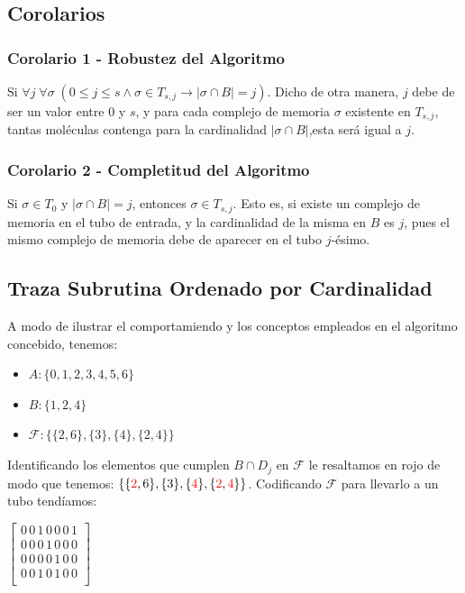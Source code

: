 \documentclass[12pt, letterpaper, twoside]{article}
\begin{document}
    \subsection{Corolarios}

    \subsubsection{Corolario 1 - Robustez del Algoritmo}
    Si $\forall{j}\;\forall\sigma\;(0\leq j \leq s \land \sigma\in T_{s,j} \rightarrow |\sigma\cap B| = j)$. Dicho de otra manera, $j$ debe de ser un valor entre $0$ y $s$, y para cada complejo de memoria $\sigma$ existente en $T_{s,j}$, tantas moléculas contenga para la cardinalidad $|\sigma\cap B|$,esta será igual a $j$. 
    \subsubsection{Corolario 2 - Completitud del Algoritmo}
    Si $\sigma\in T_0$ y $|\sigma\cap B| = j$, entonces $\sigma\in T_{s,j}$. Esto es, si existe un complejo de memoria en el tubo de entrada, y la cardinalidad de la misma en $B$ es $j$, pues el mismo complejo de memoria debe de aparecer en el tubo $j$-ésimo.

    \newpage
    \subsection{Traza Subrutina Ordenado por Cardinalidad}
    A modo de ilustrar el comportamiendo y los conceptos empleados en el algoritmo concebido, tenemos:
    \begin{itemize}
        \item $A: \{0, 1, 2, 3, 4, 5, 6\}$
        \item $B: \{1, 2, 4\}$
        \item $\mathcal{F}: \{\{2, 6\}, \{3\}, \{4\}, \{2, 4\}\}$
    \end{itemize}
    Identificando los elementos que cumplen $B\cap D_j$ en $\mathcal{F}$ le resaltamos en rojo de modo que tenemos: $\{\{\textcolor{red}{2}, 6\}, \{3\}, \{\textcolor{red}{4}\}, \{\textcolor{red}{2}, \textcolor{red}{4}\}\}$. Codificando $\mathcal{F}$ para llevarlo a un tubo tendíamos: 


    $
        \begin{bmatrix}
            0\,0\,1\,0\,0\,0\,1 \\
            0\,0\,0\,1\,0\,0\,0 \\
            0\,0\,0\,0\,1\,0\,0 \\
            0\,0\,1\,0\,1\,0\,0 \\
        \end{bmatrix}
    $ 
\end{document}

